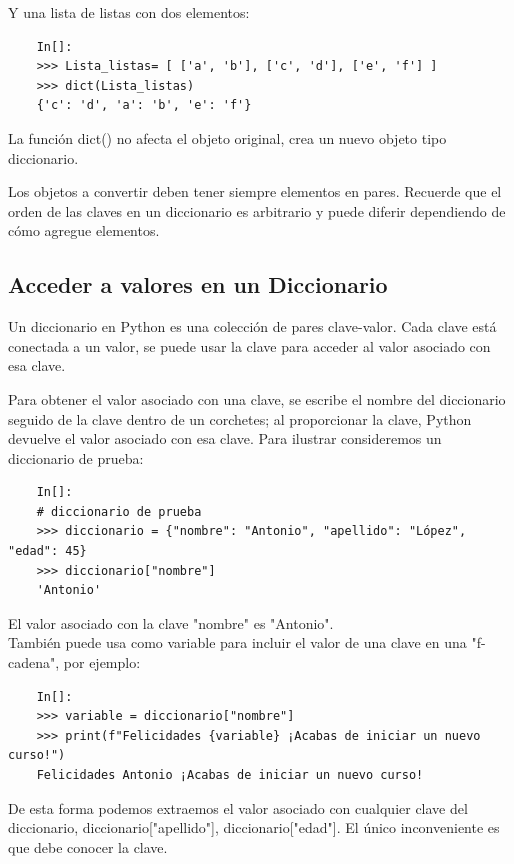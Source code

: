 Y una lista de listas con dos elementos:
\begin{lstlisting}
	In[]:
	>>> Lista_listas= [ ['a', 'b'], ['c', 'd'], ['e', 'f'] ]
	>>> dict(Lista_listas)
	{'c': 'd', 'a': 'b', 'e': 'f'}
\end{lstlisting}
La función {\ttfamily dict()} no afecta el objeto original, crea un nuevo objeto tipo diccionario.

Los objetos a convertir deben tener siempre elementos en pares. Recuerde que el orden de las claves en un diccionario es arbitrario y puede diferir dependiendo de cómo agregue elementos.



\subsection{Acceder a valores en un Diccionario}

Un diccionario en Python es una colección de pares clave-valor. Cada clave  está conectada a
un valor, se puede usar la clave para acceder al valor asociado con esa clave.   


Para obtener el valor asociado con una clave, se escribe el nombre del diccionario seguido de la clave dentro de un corchetes; al  proporcionar la clave, Python devuelve el valor asociado con esa clave. Para ilustrar consideremos un diccionario de prueba:

\begin{lstlisting}
	In[]:	
	# diccionario de prueba	
	>>> diccionario = {"nombre": "Antonio", "apellido": "López", "edad": 45}
	>>> diccionario["nombre"]
	'Antonio'
\end{lstlisting}

\noindent El valor asociado con la clave {}"{}nombre"{} es {}"{}Antonio"{}.\\


También puede usa como variable para incluir  el valor de una clave   en una {\ttfamily "f-cadena"{}}, por ejemplo:
\begin{lstlisting}
	In[]:	
	>>> variable = diccionario["nombre"]
	>>> print(f"Felicidades {variable} ¡Acabas de iniciar un nuevo curso!")
	Felicidades Antonio ¡Acabas de iniciar un nuevo curso!
\end{lstlisting}

De esta forma podemos extraemos el valor asociado con cualquier clave del diccionario, {\ttfamily 
	diccionario[{}"{}apellido{}"{}], diccionario[{}"{}edad{}"{}]}. El único inconveniente es que debe conocer la clave.


